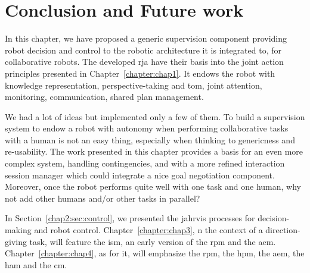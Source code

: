 \documentclass[a4paper,11pt,twoside]{StyleThese}
\begin{document}
	\setcounter{chapter}{3} %
	\dominitoc
	\faketableofcontents
	\fi

\clearpage
\chapter{Conclusion and Future work}
In this chapter, we have proposed a generic supervision component providing robot decision and control to the robotic architecture it is integrated to, for collaborative robots. The developed \acrfull{rja} have their basis into the joint action principles presented in Chapter~\ref{chapter:chap1}. It endows the robot with knowledge representation, perspective-taking and \acrshort{tom}, joint attention, monitoring, communication, shared plan management.  


We had a lot of ideas but implemented only a few of them. To build a supervision system to endow a robot with autonomy when performing collaborative tasks with a human is not an easy thing, especially when thinking to genericness and re-usability. The work presented in this chapter provides a basis for an even more complex system, handling contingencies, and with a more refined interaction session manager which could integrate a nice goal negotiation component. Moreover, once the robot performs quite well with one task and one human, why not add other humans and/or other tasks in parallel?


In Section~\ref{chap2:sec:control}, we presented the \acrshort{jahrvis} processes for decision-making and robot control. Chapter~\ref{chapter:chap3}, n the context of a direction-giving task, will feature the \acrlong{ism}, an early version of the \acrlong{rpm} and the \acrlong{aem}. Chapter~\ref{chapter:chap4}, as for it, will emphasize the \acrlong{rpm}, the \acrlong{hpm}, the \acrlong{aem}, the \acrlong{ham} and the \acrlong{cm}.

\ifdefined{}
\else


\end{document}
